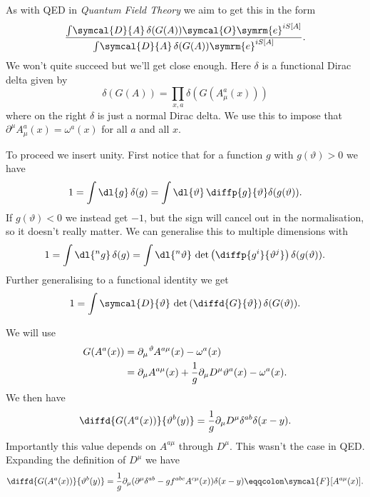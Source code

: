 \documentclass[fleqn]{NotesClass}
\newcommand*{\course}[1]{\textit{#1}}
\newcommand{\e}{\symrm{e}}
\newcommand{\covariantDerivative}{D}
\newcommand{\DL}[1]{\symcal{D}{#1}}
\begin{document}
    As with QED in \course{Quantum Field Theory} we aim to get this in the form
    \begin{equation}
        \frac{\int \! \DL{A} \, \delta(G(A)) \symcal{O} \e^{iS[A]}}{\int \! \DL{A} \, \delta(G(A)) \e^{iS[A]}}.
    \end{equation}
    We won't quite succeed but we'll get close enough.
    Here \(\delta\) is a functional Dirac delta given by
    \begin{equation}
        \delta(G(A)) = \prod_{x, a} \delta(G(A^a_\mu(x)))
    \end{equation}
    where on the right \(\delta\) is just a normal Dirac delta.
    We use this to impose that \(\partial^\mu A^a_\mu(x) = \omega^a(x)\) for all \(a\) and all \(x\).
    
    To proceed we insert unity.
    First notice that for a function \(g\) with \(g(\vartheta) > 0\) we have
    \begin{equation}
        1 = \int \dl{g} \, \delta(g) = \int \dl{\vartheta} \, \diffp{g}{\vartheta} \delta(g(\vartheta)).
    \end{equation}
    If \(g(\vartheta) < 0\) we instead get \(-1\), but the sign will cancel out in the normalisation, so it doesn't really matter.
    We can generalise this to multiple dimensions with
    \begin{equation}
        1 = \int \dl{^ng} \, \delta(g) = \int \dl{^n\vartheta} \, \det\left( \diffp{g^i}{\vartheta^j} \right) \delta(g(\vartheta)).
    \end{equation}
    Further generalising to a functional identity we get
    \begin{equation}
        1 = \int \DL{\vartheta} \, \det\left( \diffd{G}{\vartheta} \right) \delta(G(\vartheta)).
    \end{equation}
    
    We will use
    \begin{align}
        G(A^a(x)) &= \partial_\mu \tensor[^\vartheta]{A}{^{a\mu}}(x) - \omega^a(x)\\
        &= \partial_\mu A^{a\mu}(x) + \frac{1}{g} \partial_\mu \covariantDerivative^\mu \vartheta^a(x) - \omega^a(x).
    \end{align}
    We then have
    \begin{equation}
        \diffd{G(A^a(x))}{\vartheta^b(y)} = \frac{1}{g} \partial_\mu \covariantDerivative^\mu \delta^{ab} \delta(x - y).
    \end{equation}
    Importantly this value depends on \(A^{a\mu}\) through \(\covariantDerivative^\mu\).
    This wasn't the case in QED.
    Expanding the definition of \(\covariantDerivative^\mu\) we have
    \begin{equation}
        \diffd{G(A^a(x))}{\vartheta^b(y)} = \frac{1}{g}\partial_\mu (\partial^\mu \delta^{ab} - gf^{abc}A^{c\mu}(x)) \delta(x - y) \eqqcolon \symcal{F}[A^{a\mu}(x)].
    \end{equation}
    
\end{document}
